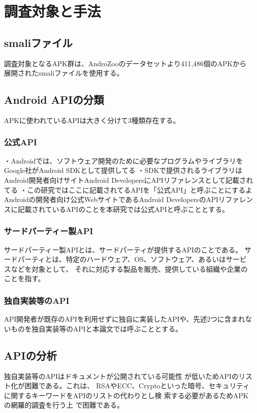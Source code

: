 \newpage
\section{調査対象と手法}
\subsection {smaliファイル}

調査対象となるAPK群は、AndroZoo\cite{}のデータセットより411,486個のAPKから展開されたsmaliファイルを使用する。

\subsection{Android APIの分類}
APKに使われているAPIは大きく分けて3種類存在する。
　\subsubsection {公式API}
・Androidでは、ソフトウェア開発のために必要なプログラムやライブラリをGoogle社がAndroid SDKとして提供してる
・SDKで提供されるライブラリはAndroid開発者向けサイトAndroid DevelopersにAPIリファレンスとして記載されてる
・この研究ではここに記載されてるAPIを「公式API」と呼ぶことにするよ
\fi
Androidの開発者向け公式WebサイトであるAndroid DevelopersのAPIリファレンスに記載されているAPIのことを本研究では公式APIと呼ぶこととする。
　\subsubsection {サードパーティー製API}
サードパーティー製APIとは、サードパーティが提供するAPIのことである。
サードパーティとは、特定のハードウェア、OS、ソフトウェア、あるいはサービスなどを対象として、
それに対応する製品を販売、提供している組織や企業のことを指す。
　\subsubsection {独自実装等のAPI}
API開発者が既存のAPIを利用せずに独自に実装したAPIや、先述2つに含まれないものを独自実装等のAPIと本論文では呼ぶこととする。

\subsection{APIの分析}
独自実装等のAPIはドキュメントが公開されている可能性
が低いためAPIのリスト化が困難である。これは、
RSAやECC、Cryptoといった暗号、セキュリティ
に関するキーワードをAPIのリストの代わりとし検
索する必要があるためAPKの網羅的調査を行う上
で困難である。

